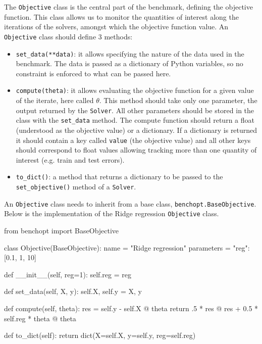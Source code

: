 \documentclass{article}
\begin{document}
The \texttt{Objective} class is the central part of the benchmark, defining the objective function.
This class allows us to monitor the quantities of interest along the iterations of the solvers, amongst which the objective function value.
An \texttt{Objective} class should define 3 methods:

\begin{itemize}[topsep=0pt,itemsep=1ex,partopsep=0ex,parsep=0ex,leftmargin=3ex]
    \item \texttt{set\_data(**data)}: it allows specifying the nature of the data used in the benchmark.
    The data is passed as a dictionary of Python variables, so no constraint is enforced to what can be passed here.
    \item \texttt{compute(theta)}: it allows evaluating the objective function for a given value of the iterate, here called $\theta$.
    This method should take only one parameter, the output returned by the \texttt{Solver}.
    All other parameters should be stored in the class with the \texttt{set\_data} method.
    The compute function should return a float (understood as the objective value) or a dictionary.
    If a dictionary is returned it should contain a key called \texttt{value} (the objective value) and all other keys should correspond to float values allowing tracking more than one quantity of interest (e.g. train and test errors).
    \item \texttt{to\_dict()}: a method that returns a dictionary to be passed to the \texttt{set\_objective()} method of a \texttt{Solver}.
\end{itemize}
An \texttt{Objective} class needs to inherit from a base class, \texttt{benchopt.BaseObjective}.
Below is the implementation of the Ridge regression \texttt{Objective} class.

\begin{python}
from benchopt import BaseObjective


class Objective(BaseObjective):
    name = "Ridge regression"
    parameters = {"reg": [0.1, 1, 10]}

    def __init__(self, reg=1):
        self.reg = reg

    def set_data(self, X, y):
        self.X, self.y = X, y

    def compute(self, theta):
        res = self.y - self.X @ theta
        return .5 * res @ res + 0.5 * self.reg * theta @ theta

    def to_dict(self):
        return dict(X=self.X, y=self.y, reg=self.reg)

\end{python}
\end{document}
